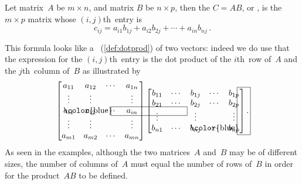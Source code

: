 \begin{definition} \label{def:matprod}
  Let matrix~\(A\) be \(m\times n\), and matrix \(B\) be \(n\times 
  p\), then the  \(C=AB\), or 
  , is the \(m\times p\) matrix whose \((i,j)\)th~entry is
\begin{equation*}
c_{ij}=a_{i1}b_{1j}+a_{i2}b_{2j}+\cdots+a_{in}b_{nj}\,.
\end{equation*}
\end{definition}

This formula looks like a ~(\cref{def:dotprod}) of two vectors: indeed we do use that the expression for the \((i,j)\)th~entry is the dot product of the \(i\)th~row of~\(A\) and the \(j\)th~column of~\(B\) as illustrated by
\begin{equation*}
\begin{bmatrix} a_{11}&a_{12}&\cdots&a_{1n}
\\\vdots&\vdots&&\vdots
\\\rlap{\color{blue}\hspace{-0.2em}\framebox{\phantom{\rule{8.7em}{1ex}}}}
a_{i1}&a_{i2}&\cdots&a_{in}
\\\vdots&\vdots&&\vdots
\\a_{m1}&a_{m2}&\cdots&a_{mn} \end{bmatrix}
\begin{bmatrix} b_{11}&\cdots&b_{1j}&\cdots&b_{1p}
\\b_{21}&\cdots&b_{2j}&\cdots&b_{2p}
\\\vdots&&\vdots&&\vdots
\\b_{n1}&\cdots&
\rlap{\color{blue}\hspace{-0.25em}\smash{\framebox{\phantom{\rule[-0.5ex]{1em}{12ex}}}}}
b_{nj}&\cdots&b_{np} \end{bmatrix}.
\end{equation*}
As seen in the examples, although the two matrices~\(A\) and~\(B\) may be of different sizes, the number of columns of~\(A\) must equal the number of rows of~\(B\) in order for the product~\(AB\) to be defined.




